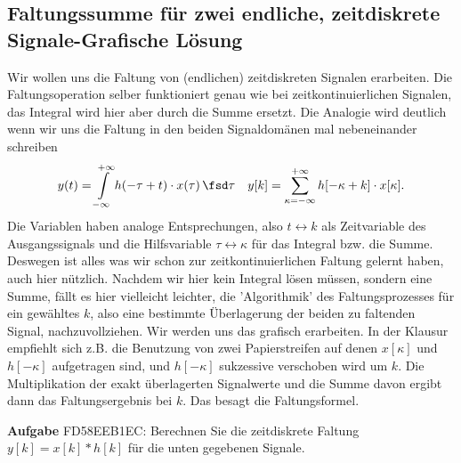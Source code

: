\clearpage
\subsection{Faltungssumme für zwei endliche, zeitdiskrete Signale-Grafische Lösung}
\label{sec:FD58EEB1EC}
\begin{Ziel}
Wir wollen uns die Faltung von (endlichen) zeitdiskreten Signalen erarbeiten.
Die Faltungsoperation selber funktioniert genau wie bei zeitkontinuierlichen
Signalen, das Integral wird hier aber durch die Summe ersetzt.
Die Analogie wird deutlich wenn wir uns die Faltung in den beiden
Signaldomänen mal nebeneinander schreiben
\begin{align}
y(t) = \int\limits_{-\infty}^{+\infty} h(-\tau+t) \cdot x(\tau) \, \fsd \tau\quad
y[k] = \sum\limits_{\kappa = -\infty}^{+\infty} h[-\kappa+k] \cdot x[\kappa].
\end{align}
Die Variablen haben analoge Entsprechungen, also $t \leftrightarrow k$ als
Zeitvariable des Ausgangssignals und
die Hilfsvariable $\tau \leftrightarrow \kappa$ für das Integral bzw. die Summe.
%
Deswegen ist alles was wir schon zur zeitkontinuierlichen Faltung gelernt haben,
auch hier nützlich.
%
Nachdem wir hier kein Integral lösen müssen, sondern eine Summe,
fällt es hier vielleicht leichter, die 'Algorithmik' des Faltungsprozesses
für ein gewähltes $k$, also eine bestimmte Überlagerung der beiden zu faltenden
Signal, nachzuvollziehen.
%
Wir werden uns das grafisch erarbeiten. In der Klausur empfiehlt sich z.B.
die Benutzung von zwei Papierstreifen auf denen $x[\kappa]$ und $h[-\kappa]$
aufgetragen sind, und $h[-\kappa]$ sukzessive verschoben wird um $k$. Die
Multiplikation der exakt überlagerten Signalwerte und die Summe davon ergibt
dann das Faltungsergebnis bei $k$. Das besagt die Faltungsformel.
\end{Ziel}
\textbf{Aufgabe} {\tiny FD58EEB1EC}: Berechnen Sie die zeitdiskrete Faltung
$y[k] = x[k] \ast h[k]$ für die unten gegebenen Signale.
%
\begin{center}
\end{center}
